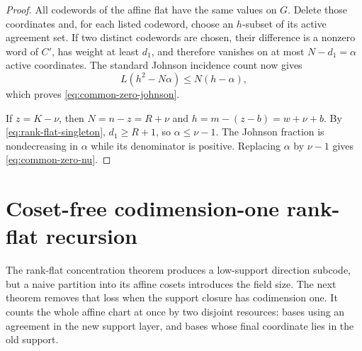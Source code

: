 \documentclass[11pt,a4paper]{amsart}
\numberwithin{equation}{section}
\theoremstyle{remark}
\begin{document}
\begin{proof}
All codewords of the affine flat have the same values on \(G\).  Delete
those coordinates and, for each listed codeword, choose an \(h\)-subset of
its active agreement set.  If two distinct codewords are chosen, their
difference is a nonzero word of \(C'\), has weight at least \(d_1\), and
therefore vanishes on at most \(N-d_1=\alpha\) active coordinates.  The
standard Johnson incidence count now gives
\[
 L(h^2-N\alpha)\le N(h-\alpha),
\]
which proves \eqref{eq:common-zero-johnson}.

If \(z=K-\nu\), then \(N=n-z=R+\nu\) and
\(h=m-(z-b)=w+\nu+b\).  By \eqref{eq:rank-flat-singleton},
\(d_1\ge R+1\), so \(\alpha\le\nu-1\).  The Johnson fraction is
nondecreasing in \(\alpha\) while its denominator is positive.  Replacing
\(\alpha\) by \(\nu-1\) gives \eqref{eq:common-zero-nu}.
\end{proof}

\section{Coset-free codimension-one rank-flat recursion}
\label{sec:codim-one-recursion}
The rank-flat concentration theorem produces a low-support direction
subcode, but a naive partition into its affine cosets introduces the field
size.  The next theorem removes that loss when the support closure has
codimension one.  It counts the whole affine chart at once by two disjoint
resources: bases using an agreement in the new support layer, and bases
whose final coordinate lies in the old support.
\end{document}
